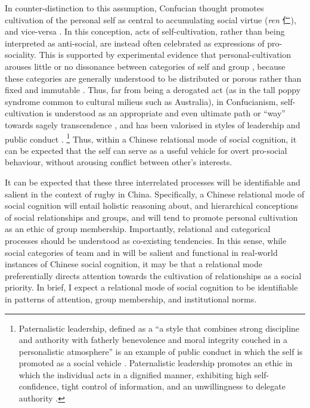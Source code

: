 \begin{CJK}{UTF8}{gbsn}
In counter-distinction to this assumption, Confucian thought promotes cultivation of the personal self as central to accumulating social virtue (\textit{ren} 仁), and vice-versa \citep{Hwang2012}.
In this conception, acts of self-cultivation, rather than being interpreted as anti-social, are instead often celebrated as expressions of pro-sociality.  This is supported by experimental evidence that personal-cultivation arouses little or no dissonance between categories of self and group \citep{Suh2002}, because these categories are generally understood to be distributed or porous rather than fixed and immutable \citep{Nisbett2003}.  Thus, far from being a derogated act (as in the tall poppy syndrome common to cultural milieus such as Australia), in Confucianism, self-cultivation is understood as an appropriate and even ultimate path or ``way'' towards sagely transcendence \citep[106]{Hwang2012}, and has been valorised in styles of leadership and public conduct \citep{Farh2000,Cheng2004}.
  \footnote{Paternalistic leadership, defined as a ``a style that combines strong discipline and authority with fatherly benevolence and moral integrity couched in a personalistic atmosphere'' is an example of public conduct in which the self is promoted as a social vehicle \citep[91]{Cheng2004}.  Paternalistic leadership promotes an ethic in which the individual acts in a dignified manner, exhibiting high self-confidence, tight control of information, and an unwillingness to delegate authority \citep{Liu2003}.}
Thus, within a Chinese relational mode of social cognition, it can be expected that the self can serve as a useful vehicle for overt pro-social behaviour, without arousing conflict between other's interests.

It can be expected that these three interrelated processes will be identifiable and salient in the context of rugby in China.  Specifically, a Chinese relational mode of social cognition will entail holistic reasoning about, and hierarchical conceptions of social relationships and groups, and will tend to promote personal cultivation as an ethic of group membership.    Importantly, relational and categorical processes should be understood as co-existing tendencies.  In this sense, while social categories of team and in will be salient and functional in real-world instances of Chinese social cognition, it may be that a relational mode preferentially directs attention towards the cultivation of relationships as a social priority.  In brief, I expect a relational mode of social cognition to be identifiable in patterns of attention, group membership, and institutional norms.


\end{CJK}
